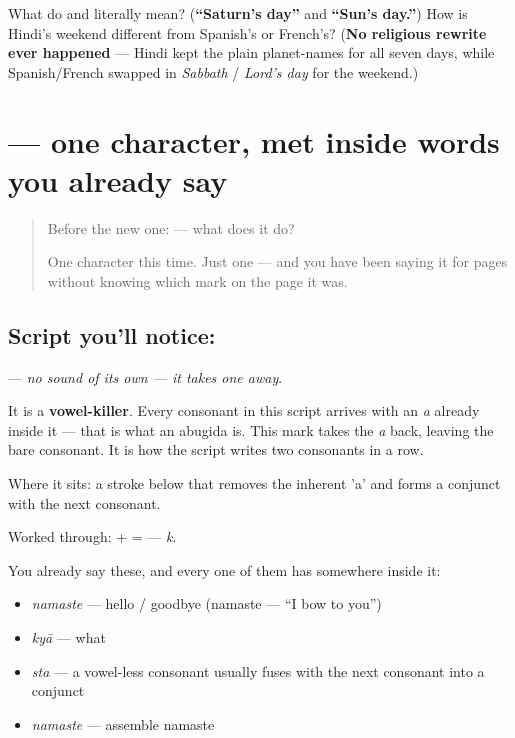 \begin{tcolorbox}[breakable,colback=teal!4,colframe=teal!35!black,title={Before you move on}]
What do \textbf{} and \textbf{} literally mean? (\textbf{\textquotedblleft{}Saturn's day\textquotedblright{}} and \textbf{\textquotedblleft{}Sun's day.\textquotedblright{}}) How is Hindi's weekend different from Spanish's or French's? (\textbf{No religious rewrite ever happened} — Hindi kept the plain planet-names for all seven days, while Spanish/French swapped in \emph{Sabbath} / \emph{Lord's day} for the weekend.)
\end{tcolorbox}
\section[\texorpdfstring{\hi{्} ((vowel killer))}{् ((vowel killer))}]{ — one character, met inside words you already say}

\label{lesson:HI-S05-sign-virama}



\begin{quote}
Before the new one:  — what does it do?

One character this time. Just one — and you have been saying it for pages without knowing which mark on the page it was.
\end{quote}

\subsection*{Script you'll notice: }
\textbf{} — \emph{no sound of its own — it takes one away}.

It is a \textbf{vowel-killer}. Every consonant in this script arrives with an \emph{a} already inside it — that is what an abugida is. This mark takes the \emph{a} back, leaving the bare consonant. It is how the script writes two consonants in a row.

Where it sits: a stroke below that removes the inherent 'a' and forms a conjunct with the next consonant.

Worked through: \textbf{} + \textbf{} = \textbf{} — \emph{k}.

You already say these, and every one of them has  somewhere inside it:

\begin{itemize}
\raggedright
  \item \textbf{} \emph{namaste} — hello / goodbye (namaste — \textquotedblleft{}I bow to you\textquotedblright{})
  \item \textbf{} \emph{kyā} — what
  \item \textbf{} \emph{sta} — a vowel-less consonant usually fuses with the next consonant into a conjunct
  \item \textbf{} \emph{namaste} — assemble namaste
\end{itemize}

